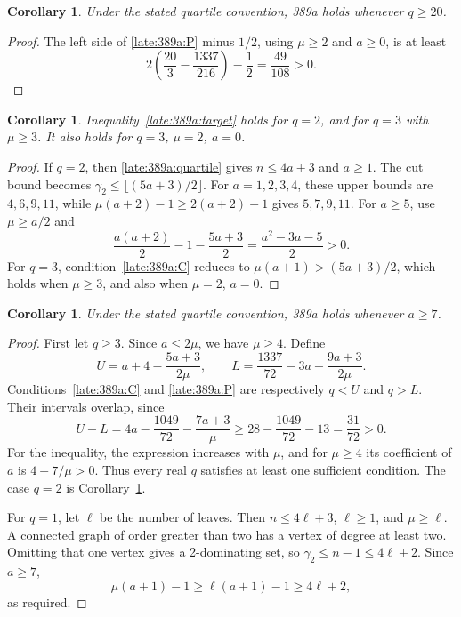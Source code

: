 \documentclass[11pt,a4paper]{article}
\newtheorem{corollary}[theorem]{Corollary}
\theoremstyle{definition}\newtheorem{definition}[theorem]{Definition}
\theoremstyle{remark}\newtheorem{remark}[theorem]{Remark}
\begin{document}
\begin{corollary}\label{late:389a:q20}
Under the stated quartile convention, 389a holds whenever $q\ge20$.
\end{corollary}
\begin{proof}
The left side of \eqref{late:389a:P} minus $1/2$, using
$\mu\ge2$ and $a\ge0$, is at least
\[
 2\left(\frac{20}{3}-\frac{1337}{216}\right)-\frac12
 =\frac{49}{108}>0.
\]
\end{proof}

\begin{corollary}\label{late:389a:smallq}
Inequality~\eqref{late:389a:target} holds for $q=2$, and for $q=3$ with
$\mu\ge3$. It also holds for $q=3$, $\mu=2$, $a=0$.
\end{corollary}
\begin{proof}
If $q=2$, then \eqref{late:389a:quartile} gives $n\le4a+3$ and $a\ge1$.
The cut bound becomes $\gamma_2\le\lfloor(5a+3)/2\rfloor$.
For $a=1,2,3,4$, these upper bounds are $4,6,9,11$, while
$\mu(a+2)-1\ge2(a+2)-1$ gives $5,7,9,11$. For $a\ge5$, use
$\mu\ge a/2$ and
\[
 \frac{a(a+2)}2-1-\frac{5a+3}2
 =\frac{a^2-3a-5}{2}>0.
\]
For $q=3$, condition~\eqref{late:389a:C} reduces to
$\mu(a+1)>(5a+3)/2$, which holds when $\mu\ge3$, and also when
$\mu=2$, $a=0$.
\end{proof}

\begin{corollary}\label{late:389a:a7}
Under the stated quartile convention, 389a holds whenever $a\ge7$.
\end{corollary}
\begin{proof}
First let $q\ge3$. Since $a\le2\mu$, we have $\mu\ge4$. Define
\[
 U=a+4-\frac{5a+3}{2\mu},\qquad
 L=\frac{1337}{72}-3a+\frac{9a+3}{2\mu}.
\]
Conditions~\eqref{late:389a:C} and \eqref{late:389a:P} are respectively
$q<U$ and $q>L$. Their intervals overlap, since
\[
 U-L=4a-\frac{1049}{72}-\frac{7a+3}{\mu}
 \ge28-\frac{1049}{72}-13=\frac{31}{72}>0.
\]
For the inequality, the expression increases with $\mu$, and for
$\mu\ge4$ its coefficient of $a$ is $4-7/\mu>0$. Thus every real $q$
satisfies at least one sufficient condition. The case $q=2$ is
Corollary~\ref{late:389a:smallq}.

For $q=1$, let $\ell$ be the number of leaves. Then
$n\le4\ell+3$, $\ell\ge1$, and $\mu\ge\ell$. A connected graph of
order greater than two has a vertex of degree at least two. Omitting that
one vertex gives a 2-dominating set, so
$\gamma_2\le n-1\le4\ell+2$. Since $a\ge7$,
\[
 \mu(a+1)-1\ge\ell(a+1)-1\ge4\ell+2,
\]
as required.
\end{proof}
\end{document}
